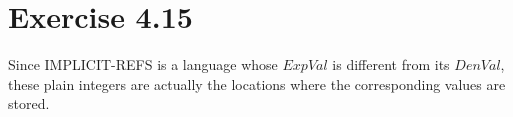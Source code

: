 \section*{Exercise 4.15}

Since IMPLICIT-REFS is a language whose $ExpVal$ is different from its $DenVal$,
these plain integers are actually the locations where
the corresponding values are stored.

